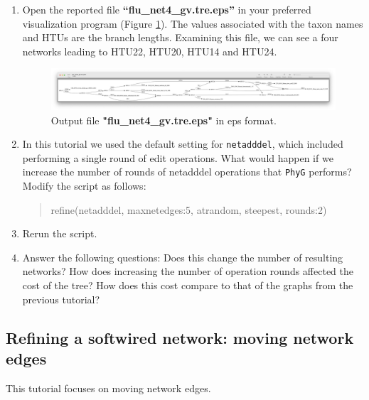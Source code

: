 \documentclass[11pt]{article}
\newcommand{\phyg}{\texttt{PhyG} }
\begin{document}
\begin {enumerate}
\item  Open the reported file \textbf{``flu\_net4\_gv.tre.eps''} in your preferred
visualization program (Figure \ref{eps4}). The values associated with the taxon 
names and HTUs are the branch lengths. Examining this file, we can see a four
networks leading to HTU22, HTU20, HTU14 and HTU24.

\begin{figure}[H]
\centering
\includegraphics[width=\textwidth]{eps4.png}
\caption{Output file \textbf{"flu\_net4\_gv.tre.eps"} in eps format.}
\label{eps4}
\end{figure}

\item In this tutorial we used the default setting for \texttt{netadddel}, which 
included performing a single round of edit operations. What would happen 
if we increase the number of rounds of netadddel operations that \phyg 
performs? \\

Modify the script as follows:

	\begin{quote}
	refine(netadddel, maxnetedges:5, atrandom, steepest, rounds:2)
	\end{quote}
	
\item Rerun the script.

\item Answer the following questions: 
\subitem Does this change the number of resulting networks?
\subitem How does increasing the number of operation rounds affected the 
cost of the tree?
\subitem How does this cost compare to that of the graphs from the previous tutorial?

\end{enumerate}
\subsection{Refining a softwired network: moving network edges}
\label{subsec:netmove}

This tutorial focuses on moving network edges.
\end{document}
